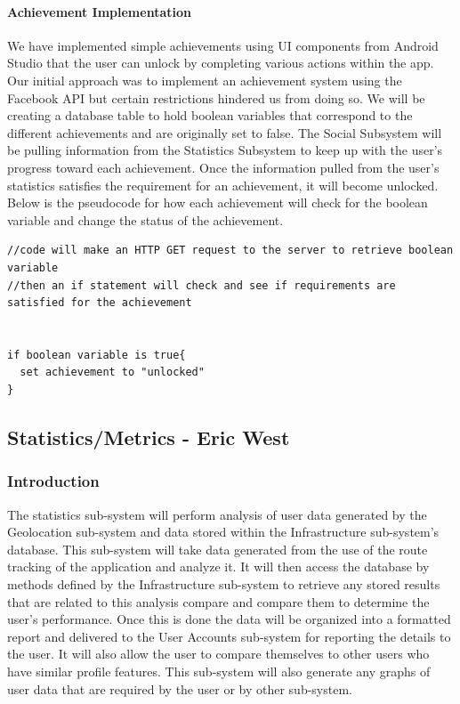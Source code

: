 \documentclass{article}
\begin{document}
\paragraph{Achievement Implementation}
We have implemented simple achievements using UI components from Android Studio that the user can unlock by completing various actions within the app.  Our initial approach was to implement an achievement system using the Facebook API but certain restrictions hindered us from doing so. We will be creating a database table to hold boolean variables that correspond to the different achievements and are originally set to false. The Social Subsystem will be pulling information from the Statistics Subsystem to keep up with the user's progress toward each achievement. Once the information pulled from the user's statistics satisfies the requirement for an achievement, it will become unlocked. Below is the pseudocode for how each achievement will check for the boolean variable and change the status of the achievement.

\begin{lstlisting}
//code will make an HTTP GET request to the server to retrieve boolean variable
//then an if statement will check and see if requirements are satisfied for the achievement


if boolean variable is true{
  set achievement to "unlocked"
}

\end{lstlisting}

\newpage

\subsection{Statistics/Metrics - Eric West}
\subsubsection{Introduction}
The statistics sub-system will perform analysis of user data generated by the Geolocation sub-system and data stored within the Infrastructure sub-system's database. This sub-system will take data generated from the use of the route tracking of the application and analyze it. It will then access the database by methods defined by the Infrastructure sub-system to retrieve any stored results that are related to this analysis compare and compare them to determine the user's performance. Once this is done the data will be organized into a formatted report and delivered to the User Accounts sub-system for reporting the details to the user. It will also allow the user to compare themselves to other users who have similar profile features. This sub-system will also generate any graphs of user data that are required by the user or by other sub-system.
\end{document}
